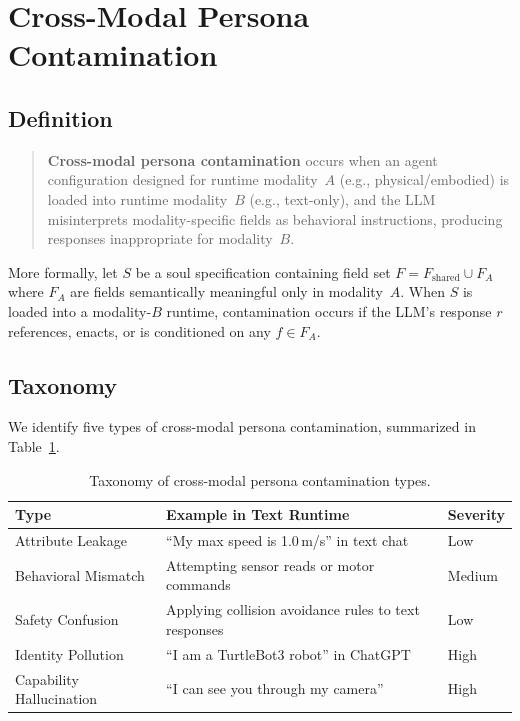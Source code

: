 \documentclass[manuscript,screen,nonacm]{acmart}
\begin{document}
\section{Cross-Modal Persona Contamination}
\label{sec:contamination}

\subsection{Definition}

\begin{quote}
\textbf{Cross-modal persona contamination} occurs when an agent configuration designed for runtime modality~$A$ (e.g., physical/embodied) is loaded into runtime modality~$B$ (e.g., text-only), and the LLM misinterprets modality-specific fields as behavioral instructions, producing responses inappropriate for modality~$B$.
\end{quote}

More formally, let $S$ be a soul specification containing field set $F = F_{\text{shared}} \cup F_A$ where $F_A$ are fields semantically meaningful only in modality~$A$.
When $S$ is loaded into a modality-$B$ runtime, contamination occurs if the LLM's response $r$ references, enacts, or is conditioned on any $f \in F_A$.

\subsection{Taxonomy}

We identify five types of cross-modal persona contamination, summarized in Table~\ref{tab:taxonomy}.

\begin{table}[t]
\caption{Taxonomy of cross-modal persona contamination types.}
\label{tab:taxonomy}
\begin{tabular}{p{2.8cm}p{3.5cm}p{1.2cm}}
\toprule
\textbf{Type} & \textbf{Example in Text Runtime} & \textbf{Severity} \\
\midrule
Attribute Leakage & ``My max speed is 1.0\,m/s'' in text chat & Low \\
Behavioral Mismatch & Attempting sensor reads or motor commands & Medium \\
Safety Confusion & Applying collision avoidance rules to text responses & Low \\
Identity Pollution & ``I am a TurtleBot3 robot'' in ChatGPT & High \\
Capability Hallucination & ``I can see you through my camera'' & High \\
\bottomrule
\end{tabular}
\end{table}
\end{document}
